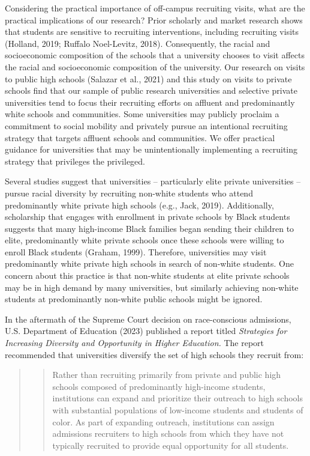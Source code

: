 \documentclass[
  12pt,
]{article}
\begin{document}
Considering the practical importance of off-campus recruiting visits, what are the practical implications of our research? Prior scholarly and market research shows that students are sensitive to recruiting interventions, including recruiting visits (Holland, 2019; Ruffalo Noel-Levitz, 2018). Consequently, the racial and socioeconomic composition of the schools that a university chooses to visit affects the racial and socioeconomic composition of the university. Our research on visits to public high schools (Salazar et al., 2021) and this study on visits to private schools find that our sample of public research universities and selective private universities tend to focus their recruiting efforts on affluent and predominantly white schools and communities. Some universities may publicly proclaim a commitment to social mobility and privately pursue an intentional recruiting strategy that targets affluent schools and communities. We offer practical guidance for universities that may be unintentionally implementing a recruiting strategy that privileges the privileged.

Several studies suggest that universities -- particularly elite private universities -- pursue racial diversity by recruiting non-white students who attend predominantly white private high schools (e.g., Jack, 2019). Additionally, scholarship that engages with enrollment in private schools by Black students suggests that many high-income Black families began sending their children to elite, predominantly white private schools once these schools were willing to enroll Black students (Graham, 1999). Therefore, universities may visit predominantly white private high schools in search of non-white students. One concern about this practice is that non-white students at elite private schools may be in high demand by many universities, but similarly achieving non-white students at predominantly non-white public schools might be ignored.

In the aftermath of the Supreme Court decision on race-conscious admissions, U.S. Department of Education (2023) published a report titled \emph{Strategies for Increasing Diversity and Opportunity in Higher Education.} The report recommended that universities diversify the set of high schools they recruit from:

\begin{quote}
\begin{quote}
Rather than recruiting primarily from private and public high schools composed of predominantly high-income students, institutions can expand and prioritize their outreach to high schools with substantial populations of low-income students and students of color. As part of expanding outreach, institutions can assign admissions recruiters to high schools from which they have not typically recruited to provide equal opportunity for all students.
\end{quote}
\end{quote}
\end{document}
